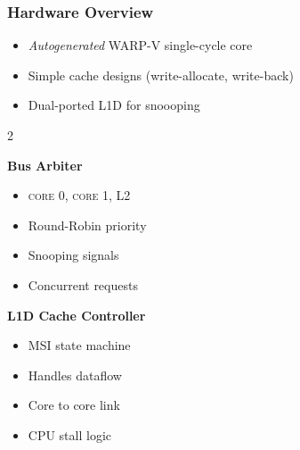 \documentclass{beamer}
\begin{document}
\begin{frame}
\frametitle{Hardware Overview}

\begin{itemize} 
  \item \textit{Autogenerated} WARP-V single-cycle core
  \item Simple cache designs (write-allocate, write-back)
  \item Dual-ported L1D for snoooping
\end{itemize}

\begin{multicols}{2}

\begin{tcolorbox}[colback=blue!5!white,colframe=blue!75!black]
  \begin{center}
    \textbf{Bus Arbiter}
  \end{center}
  \begin{itemize} 
    \item \textsc{core 0}, \textsc{core 1}, L2
    \item Round-Robin priority
    \item Snooping signals
    \item Concurrent requests
  \end{itemize} 
\end{tcolorbox}

\columnbreak

\begin{tcolorbox}[colback=classicrose!50!white,colframe=classicrose!35!black]
  \begin{center}
    \textbf{L1D Cache Controller}
  \end{center}
  \begin{itemize} 
    \item MSI state machine 
    \item Handles dataflow 
    \item Core to core link
    \item CPU stall logic
  \end{itemize}
\end{tcolorbox}


\end{multicols}


\end{frame}
\end{document}
